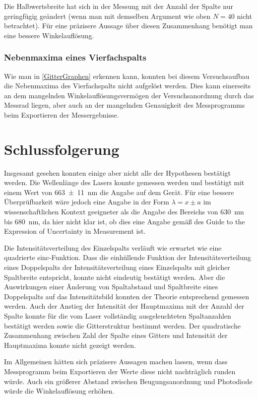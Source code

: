 \documentclass[
	a4paper,
	12pt,
	pagesize,
	ngerman
]{scrartcl}
\begin{document}
	Die Halbwertsbreite hat sich in der Messung mit der Anzahl der Spalte nur geringfügig geändert (wenn man mit demselben Argument wie oben $N=40$ nicht betrachtet).
	Für eine präzisere Aussage über diesen Zusammenhang benötigt man eine bessere Winkelauflösung.
	\subsubsection{Nebenmaxima eines Vierfachspalts}
	Wie man in \cref{GitterGraphen} erkennen kann, konnten bei diesem Versuchsaufbau die Nebenmaxima des Vierfachspalts nicht aufgelöst werden.
	Dies kann einerseits an dem mangelnden Winkelauflösungsvermögen der Versuchsanordnung durch das Messrad liegen, aber auch an der mangelnden Genauigkeit des Messprogramms beim Exportieren der Messergebnisse.
	
	

	
	\section{Schlussfolgerung}
	Insgesamt gesehen konnten einige aber nicht alle der Hypothesen bestätigt werden.
	Die Wellenlänge des Lasers konnte gemessen werden und bestätigt mit einem Wert von \SI{663\pm 11}{nm} die Angabe auf dem Gerät.
	Für eine bessere Überprüfbarkeit wäre jedoch eine Angabe in der Form $\lambda = x\pm a$ im wissenschaftlichen Kontext geeigneter als die Angabe des Bereichs von \SI{630}{\nano \meter} bis \SI{680}{\nano \meter}, da hier nicht klar ist, ob dies eine Angabe gemäß des Guide to the Expression of Uncertainty in Measurement ist.
	
	Die Intensitätsverteilung des Einzelspalts verläuft wie erwartet wie eine quadrierte sinc-Funktion.
	Dass die einhüllende Funktion der Intensitätsverteilung eines Doppelspalts der Intensitätsverteilung eines Einzelspalts mit gleicher Spaltbreite entspricht, konnte nicht eindeutig bestätigt werden.
	Aber die Auswirkungen einer Änderung von Spaltabstand und Spaltbreite eines Doppelspalts auf das Intensitätsbild konnten der Theorie entsprechend gemessen werden.
	Auch der Anstieg der Intensität der Hauptmaxima mit der Anzahl der Spalte konnte für die vom Laser vollständig ausgeleuchteten Spaltanzahlen bestätigt werden sowie die Gitterstruktur bestimmt werden.
	Der quadratische Zusammenhang zwischen Zahl der Spalte eines Gitters und Intensität der Hauptmaxima konnte nicht gezeigt werden.
	
	Im Allgemeinen hätten sich präzisere Aussagen machen lassen, wenn dass Messprogramm beim Exportieren der Werte diese nicht nachträglich runden würde.
	Auch ein größerer Abstand zwischen Beugungsanordnung und Photodiode würde die Winkelauflösung erhöhen.
	
	\printbibliography
\end{document}
